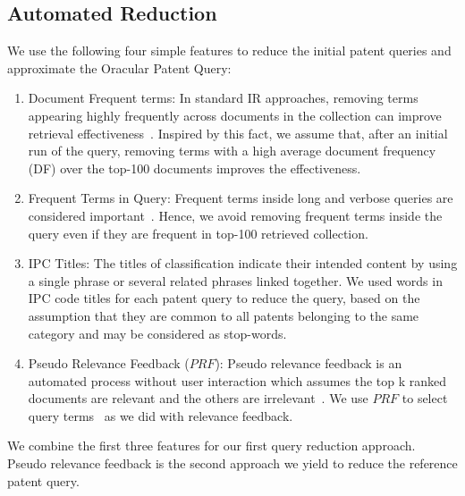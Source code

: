 \subsection{Automated Reduction}
We use the following four simple features to reduce the initial patent queries and approximate the Oracular Patent Query: 
\begin{enumerate}
\item Document Frequent terms: In standard IR approaches, removing terms appearing highly frequently across documents in the collection can improve retrieval effectiveness~\citep{manning2008introduction}. Inspired by this fact, we assume that, after an initial run of the query, removing terms  with a high average document frequency (DF) over the top-100 documents improves the effectiveness. 
\item Frequent Terms in Query: Frequent terms inside long and verbose queries are considered important~\citep{maxwell2013compact}. Hence, we avoid removing frequent terms inside the query even if they are frequent in top-100 retrieved collection.
\item IPC Titles: The titles of classification indicate their intended content by using a single phrase or several related phrases linked together. We used words in IPC code titles for each patent query to reduce the query, based on the assumption that they are common to all patents belonging to the same category and may be considered as stop-words.
\item Pseudo Relevance Feedback ($\mathit{PRF}$): Pseudo relevance feedback is an automated process without user interaction which assumes the top k ranked documents are relevant and the others are irrelevant~\citep{Baeza-Yates2011}. We use $\mathit{PRF}$ to select query terms~\cite{maxwell2013compact} as we did with relevance feedback.
\end{enumerate}
We combine the first three features for our first query reduction approach. Pseudo relevance feedback is the second approach we yield to reduce the reference patent query. 
